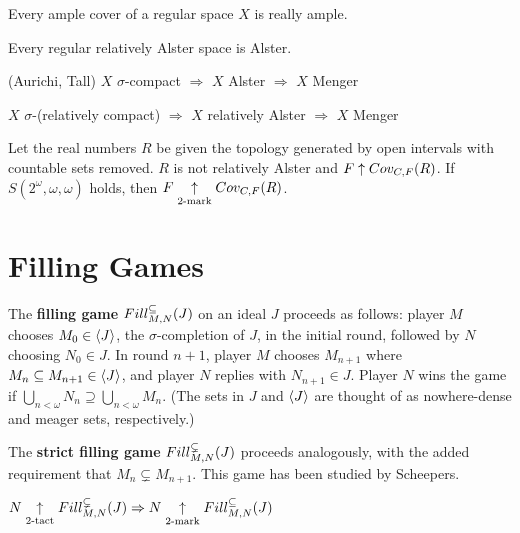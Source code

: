   \begin{prop}
    Every ample cover of a regular space $X$ is really ample.
  \end{prop}

  \begin{prop}
    Every regular relatively Alster space is Alster.
  \end{prop}

  \begin{thm}(Aurichi, Tall)
    $X$ $\sigma$-compact $\Rightarrow$ $X$ Alster $\Rightarrow$ $X$ Menger
  \end{thm}

  \begin{prop}
    $X$ $\sigma$-(relatively compact) $\Rightarrow$ $X$ relatively Alster $\Rightarrow$ $X$ Menger
  \end{prop}

  \begin{ex}
    Let the real numbers $R$ be given the topology generated by open intervals with countable sets removed. $R$ is not relatively Alster and $F\uparrow Cov_{C,F}(R)$. If $S(2^\omega,\omega,\omega)$ holds, then $F\underset{2\text{-mark}}{\uparrow}Cov_{C,F}(R)$.
  \end{ex}







  \section{Filling Games}

  \begin{defn}
    The \textbf{filling game} $Fill^{\subseteq}_{M,N}(J)$ on an ideal $J$ proceeds as follows: player $M$ chooses $M_0 \in \langle J\rangle$, the $\sigma$-completion of $J$, in the initial round, followed by $N$ choosing $N_0\in J$. In round $n+1$, player $M$ chooses $M_{n+1}$ where $M_n\subseteq M_{n+1}\in\langle J\rangle$, and player $N$ replies with $N_{n+1}\in J$. Player $N$ wins the game if $\bigcup_{n<\omega} N_n \supseteq \bigcup_{n<\omega} M_n$. (The sets in $J$ and $\langle J\rangle$ are thought of as nowhere-dense and meager sets, respectively.)

    The \textbf{strict filling game} $Fill^{\subsetneq}_{M,N}(J)$ proceeds analogously, with the added requirement that $M_n\subsetneq M_{n+1}$. This game has been studied by Scheepers.
  \end{defn}

  \begin{thm}
    $N\underset{2\text{-tact}}{\uparrow}Fill^{\subsetneq}_{M,N}(J) \Rightarrow N\underset{2\text{-mark}}{\uparrow}Fill^{\subseteq}_{M,N}(J)$
  \end{thm}

